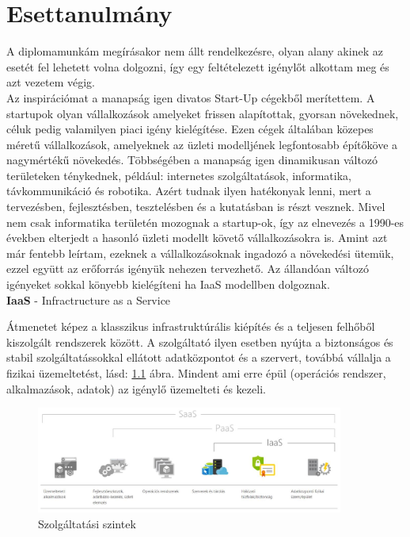\documentclass[12pt,oneside,justify,table]{book}
\begin{document}
\chapter{Esettanulmány}

A diplomamunkám megírásakor nem állt rendelkezésre, olyan alany akinek az esetét fel lehetett volna dolgozni, így egy feltételezett igénylőt alkottam meg és azt vezetem végig. \\

Az inspirációmat a manapság igen divatos Start-Up cégekből merítettem. A startupok olyan vállalkozások amelyeket frissen alapítottak, gyorsan növekednek, céluk pedig valamilyen piaci igény kielégítése. Ezen cégek általában közepes méretű vállalkozások, amelyeknek az üzleti modelljének legfontosabb építőköve a nagymértékű növekedés. Többségében a manapság igen dinamikusan változó területeken ténykednek, például: internetes szolgáltatások, informatika, távkommunikáció és robotika. Azért tudnak ilyen hatékonyak lenni, mert a tervezésben, fejlesztésben, tesztelésben és a kutatásban is részt vesznek. Mivel nem csak informatika területén mozognak a startup-ok, így az elnevezés a 1990-es években elterjedt a hasonló üzleti modellt követő vállalkozásokra is.
Amint azt már fentebb leírtam, ezeknek a vállalkozásoknak ingadozó a növekedési ütemük, ezzel együtt az erőforrás igényük nehezen tervezhető.  Az állandóan változó igényeket sokkal könyebb kielégíteni ha IaaS modellben dolgoznak.\\

\noindent \textbf{IaaS} - Infractructure as a Service \cite{IaaS}

Átmenetet képez a klasszikus infrastruktúrális kiépítés és a teljesen felhőből kiszolgált rendszerek között. A szolgáltató ilyen esetben nyújta a biztonságos és stabil szolgáltatássokkal ellátott adatközpontot és a szervert, továbbá vállalja a fizikai üzemeltetést, lásd: \ref{fig:aaS} ábra. Mindent ami erre épül (operációs rendszer, alkalmazások, adatok) az igénylő üzemelteti és kezeli. 
\begin{figure}[h]
\centering
\includegraphics[width=0.9\textwidth]{aaS.jpg}
\caption{Szolgáltatási szintek}
\label{fig:aaS}
\end{figure}
\end{document}
